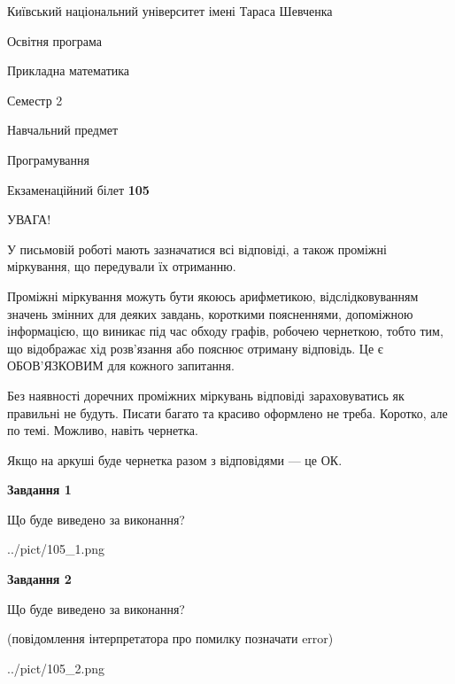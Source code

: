 \documentclass[12pt, ukrainian]{article}
\begin{document}
{{\begin {small}\par
{ \center  Київський національний університет імені Тараса Шевченка \par}
{\parbox {5 cm}{Освітня програма \hfill}{\parbox {7 cm}{Прикладна математика\hfill}}\parbox {6 cm}{\hfill Семестр 2}}\par
{\parbox {5 cm} {Навчальний предмет \hfill}\parbox {7 cm}{Програмування \hfill}\parbox {6cm}{\hfill}\par}\vspace{-7pt} \end{small}}{\center Екзаменаційний білет \No \textbf
{ 105 }\par}}
{
\begin {large}
УВАГА!

У письмовій роботі мають зазначатися всі відповіді, а також проміжні міркування, що передували їх отриманню.

Проміжні міркування можуть бути якоюсь арифметикою, відслідковуванням зна\-чень змінних для деяких завдань,
короткими поясненнями, допоміжною інформацією, що виникає під час обходу графів, робочею чернеткою,
тобто тим, що відображає хід розв’язання або пояснює отриману відповідь.
Це є ОБОВ’ЯЗКОВИМ для кожного запитання.

Без наявності доречних проміжних міркувань відповіді зараховуватись як правиль\-ні не будуть.
Писати багато та красиво оформлено не треба. Коротко, але по темі. Можли\-во, навіть чернетка.

Якщо на аркуші буде чернетка разом з відповідями --- це ОК.

\newpage

{\begin {center}\textbf{Завдання 1}\end {center}}\par
Що буде виведено за виконання?\par
\begin{center}
	{../pict/105_1.png}
\end{center}
\newpage

{\begin {center}\textbf{Завдання 2}\end {center}}\par
Що буде виведено за виконання?\par
 (повідомлення інтерпретатора про помилку позначати error)\par
\begin{center}
	{../pict/105_2.png}
\end{center}
\newpage


\end{large}}
\end{document}
